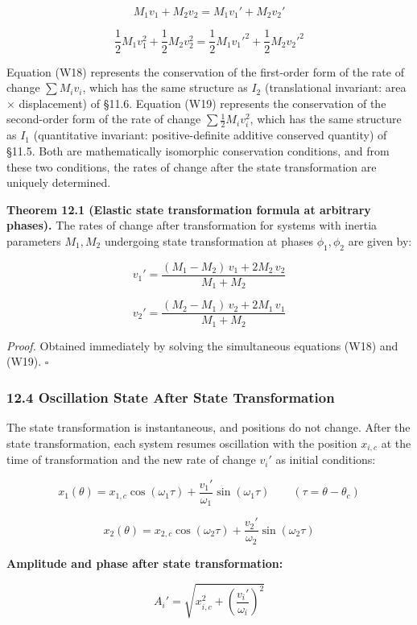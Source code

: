 \documentclass[a4paper,11pt]{article}
\begin{document}
\[M_1 v_1 + M_2 v_2 = M_1 v_1' + M_2 v_2' \tag{W18}\]

\[\frac{1}{2}M_1 v_1^2 + \frac{1}{2}M_2 v_2^2 = \frac{1}{2}M_1 v_1'^2 + \frac{1}{2}M_2 v_2'^2 \tag{W19}\]

Equation (W18) represents the conservation of the first-order form of
the rate of change \(\sum M_i v_i\), which has the same structure as
\(I_2\) (translational invariant: area \(\times\) displacement) of
§11.6. Equation (W19) represents the conservation of the second-order
form of the rate of change \(\sum \frac{1}{2}M_i v_i^2\), which has the
same structure as \(I_1\) (quantitative invariant: positive-definite
additive conserved quantity) of §11.5. Both are mathematically
isomorphic conservation conditions, and from these two conditions, the
rates of change after the state transformation are uniquely determined.

\textbf{Theorem 12.1 (Elastic state transformation formula at arbitrary
phases).} The rates of change after transformation for systems with
inertia parameters \(M_1, M_2\) undergoing state transformation at
phases \(\phi_1, \phi_2\) are given by:

\[v_1' = \frac{(M_1 - M_2)\,v_1 + 2M_2\,v_2}{M_1 + M_2} \tag{W20}\]

\[v_2' = \frac{(M_2 - M_1)\,v_2 + 2M_1\,v_1}{M_1 + M_2} \tag{W21}\]

\emph{Proof.} Obtained immediately by solving the simultaneous equations
(W18) and (W19). \(\square\)

\subsubsection{12.4 Oscillation State After State
Transformation}\label{oscillation-state-after-state-transformation}

The state transformation is instantaneous, and positions do not change.
After the state transformation, each system resumes oscillation with the
position \(x_{i,c}\) at the time of transformation and the new rate of
change \(v_i'\) as initial conditions:

\[x_1(\theta) = x_{1,c}\cos(\omega_1\tau) + \frac{v_1'}{\omega_1}\sin(\omega_1\tau) \qquad (\tau = \theta - \theta_c) \tag{W22}\]

\[x_2(\theta) = x_{2,c}\cos(\omega_2\tau) + \frac{v_2'}{\omega_2}\sin(\omega_2\tau) \tag{W23}\]

\textbf{Amplitude and phase after state transformation:}

\[A_i' = \sqrt{x_{i,c}^2 + \left(\frac{v_i'}{\omega_i}\right)^2} \tag{W24}\]
\end{document}
